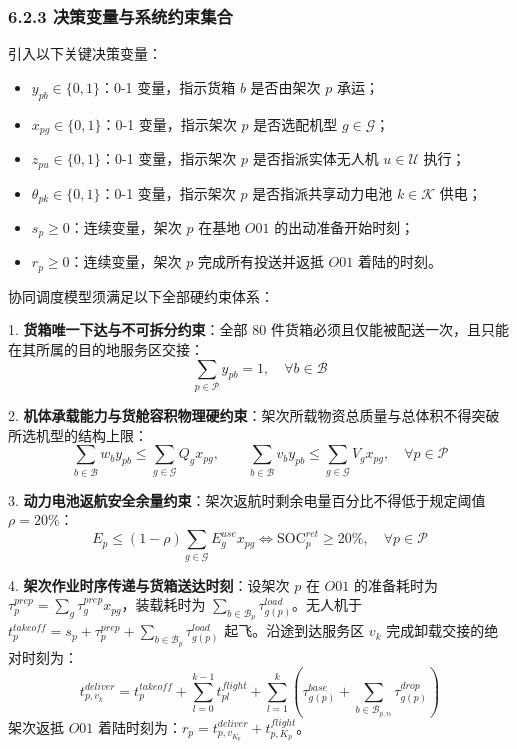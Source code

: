 \documentclass[withoutpreface,bwprint]{format}
\begin{document}
\subsubsection{6.2.3 决策变量与系统约束集合}
引入以下关键决策变量：
\begin{itemize}[leftmargin=*]
    \item $y_{pb} \in \{0, 1\}$：0-1 变量，指示货箱 $b$ 是否由架次 $p$ 承运；
    \item $x_{pg} \in \{0, 1\}$：0-1 变量，指示架次 $p$ 是否选配机型 $g \in \mathcal{G}$；
    \item $z_{pu} \in \{0, 1\}$：0-1 变量，指示架次 $p$ 是否指派实体无人机 $u \in \mathcal{U}$ 执行；
    \item $\theta_{pk} \in \{0, 1\}$：0-1 变量，指示架次 $p$ 是否指派共享动力电池 $k \in \mathcal{K}$ 供电；
    \item $s_p \ge 0$：连续变量，架次 $p$ 在基地 $O01$ 的出动准备开始时刻；
    \item $r_p \ge 0$：连续变量，架次 $p$ 完成所有投送并返抵 $O01$ 着陆的时刻。
\end{itemize}

协同调度模型须满足以下全部硬约束体系：

1. \textbf{货箱唯一下达与不可拆分约束}：全部 80 件货箱必须且仅能被配送一次，且只能在其所属的目的地服务区交接：
\begin{equation}
\sum_{p \in \mathcal{P}} y_{pb} = 1, \quad \forall b \in \mathcal{B}
\end{equation}

2. \textbf{机体承载能力与货舱容积物理硬约束}：架次所载物资总质量与总体积不得突破所选机型的结构上限：
\begin{equation}
\sum_{b \in \mathcal{B}} w_b y_{pb} \le \sum_{g \in \mathcal{G}} Q_g x_{pg}, \qquad \sum_{b \in \mathcal{B}} v_b y_{pb} \le \sum_{g \in \mathcal{G}} V_g x_{pg}, \quad \forall p \in \mathcal{P}
\end{equation}

3. \textbf{动力电池返航安全余量约束}：架次返航时剩余电量百分比不得低于规定阈值 $\rho = 20\%$：
\begin{equation}
E_p \le (1 - \rho) \sum_{g \in \mathcal{G}} E_g^{use} x_{pg} \iff \text{SOC}_p^{ret} \ge 20\%, \quad \forall p \in \mathcal{P}
\end{equation}

4. \textbf{架次作业时序传递与货箱送达时刻}：设架次 $p$ 在 $O01$ 的准备耗时为 $\tau_p^{prep} = \sum_g \tau_g^{prep} x_{pg}$，装载耗时为 $\sum_{b \in \mathcal{B}_p} \tau_{g(p)}^{load}$。无人机于 $t_p^{takeoff} = s_p + \tau_p^{prep} + \sum_{b \in \mathcal{B}_p} \tau_{g(p)}^{load}$ 起飞。沿途到达服务区 $v_k$ 完成卸载交接的绝对时刻为：
\begin{equation}
t_{p, v_k}^{deliver} = t_p^{takeoff} + \sum_{l=0}^{k-1} t_{pl}^{flight} + \sum_{l=1}^k \left( \tau_{g(p)}^{base} + \sum_{b \in \mathcal{B}_{p, v_l}} \tau_{g(p)}^{drop} \right)
\end{equation}
架次返抵 $O01$ 着陆时刻为：$r_p = t_{p, v_{K_p}}^{deliver} + t_{p, K_p}^{flight}$。
\end{document}
